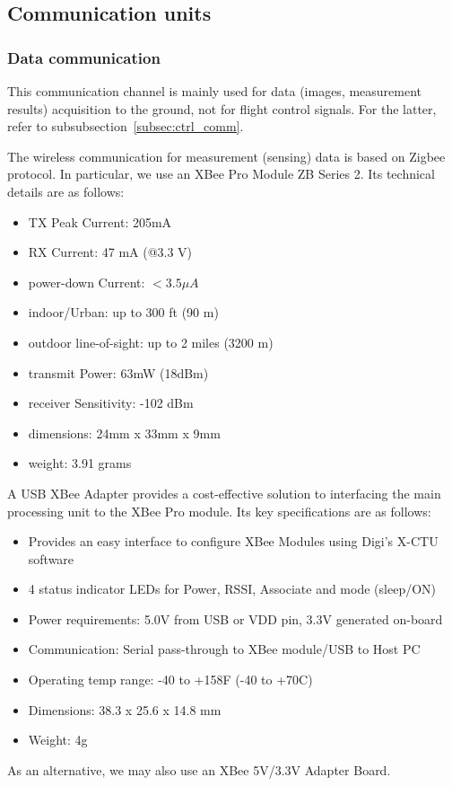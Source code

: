 \documentclass[a4paper, 10pt, twocolumn, titlepage]{article}
\begin{document}
\subsection{Communication units}
\subsubsection{Data communication}
This communication channel is mainly used for data (images, measurement results) acquisition to the ground, not for flight control signals.
For the latter, refer to subsubsection~\ref{subsec:ctrl_comm}.

The wireless communication for measurement (sensing) data is based on Zigbee protocol.
In particular, we use an XBee Pro Module ZB Series 2.
Its technical details are as follows:
\begin{itemize}
\itemsep-1mm
  \item  TX Peak Current: 205mA
  \item  RX Current: 47 mA (@3.3 V)
  \item  power-down Current: $< 3.5 \mu A$
  \item  indoor/Urban: up to 300 ft (90 m)
  \item  outdoor line-of-sight: up to 2 miles (3200 m)
  \item  transmit Power: 63mW (18dBm)
  \item  receiver Sensitivity: -102 dBm
  \item  dimensions: 24mm x 33mm x 9mm
  \item  weight: 3.91 grams
\end{itemize}

A USB XBee Adapter provides a cost-effective solution to interfacing the main processing unit to the XBee Pro module.
Its key specifications are as follows:
\begin{itemize}
\itemsep-1mm
  \item Provides an easy interface to configure XBee Modules using Digi's X-CTU software
  \item 4 status indicator LEDs for Power, RSSI, Associate and mode (sleep/ON)
  \item Power requirements: 5.0V from USB or VDD pin, 3.3V generated on-board
  \item Communication: Serial pass-through to XBee module/USB to Host PC
  \item Operating temp range: -40 to +158F (-40 to +70C)
  \item Dimensions: 38.3 x 25.6 x 14.8 mm
  \item Weight: 4g
\end{itemize}
As an alternative, we may also use an XBee 5V/3.3V Adapter Board.
\end{document}
